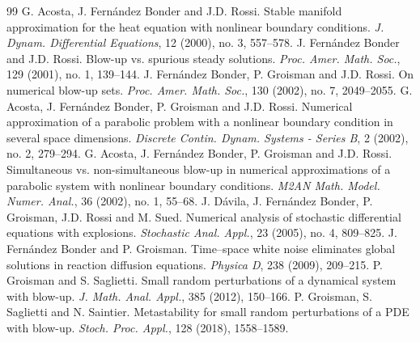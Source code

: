 \documentclass[11pt,a4paper]{article}
\begin{document}
\begin{thebibliography}{99}
 G. Acosta, J. Fernández Bonder and J.D. Rossi. Stable manifold
approximation for the heat equation with nonlinear boundary conditions.
\emph{J. Dynam. Differential Equations}, 12 (2000), no. 3, 557--578.
 J. Fernández Bonder and J.D. Rossi. Blow-up vs. spurious steady
solutions. \emph{Proc. Amer. Math. Soc.}, 129 (2001), no. 1, 139--144.
 J. Fernández Bonder, P. Groisman and J.D. Rossi. On numerical
blow-up sets. \emph{Proc. Amer. Math. Soc.}, 130 (2002), no. 7, 2049--2055.
 G. Acosta, J. Fernández Bonder, P. Groisman and J.D.
Rossi. Numerical approximation of a parabolic problem with a nonlinear
boundary condition in several space dimensions. \emph{Discrete Contin.
Dynam. Systems - Series B}, 2 (2002), no. 2, 279--294.
 G. Acosta, J. Fernández Bonder, P. Groisman and J.D.
Rossi. Simultaneous vs. non-simultaneous blow-up in numerical approximations
of a parabolic system with nonlinear boundary conditions. \emph{M2AN Math.
Model. Numer. Anal.}, 36 (2002), no. 1, 55--68.
 J. Dávila, J. Fernández Bonder, P. Groisman, J.D. Rossi and
M. Sued. Numerical analysis of stochastic differential equations with
explosions. \emph{Stochastic Anal. Appl.}, 23 (2005), no. 4, 809--825.
 J. Fernández Bonder and P. Groisman. Time--space white noise
eliminates global solutions in reaction diffusion equations.
\emph{Physica D}, 238 (2009), 209--215.
 P. Groisman and S. Saglietti. Small random perturbations of a
dynamical system with blow-up. \emph{J. Math. Anal. Appl.}, 385 (2012),
150--166.
 P. Groisman, S. Saglietti and N. Saintier. Metastability for
small random perturbations of a PDE with blow-up. \emph{Stoch. Proc. Appl.},
128 (2018), 1558--1589.
\end{thebibliography}
\end{document}
